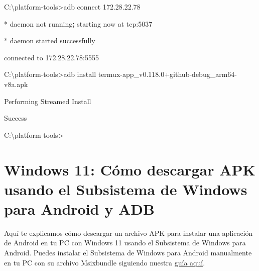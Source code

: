 \documentclass[
  doc,
  floatsintext,
  longtable,
  a4paper,
  nolmodern,
  notxfonts,
  notimes,
  12pt,
  colorlinks=true,linkcolor=blue,citecolor=blue,urlcolor=blue]{apa7}
\newenvironment{Shaded}{\begin{snugshade}}{\end{snugshade}}
\newcommand{\ExtensionTok}[1]{\textcolor[rgb]{0.00,0.23,0.31}{#1}}
\newcommand{\KeywordTok}[1]{\textcolor[rgb]{0.00,0.23,0.31}{\textbf{#1}}}
\newcommand{\NormalTok}[1]{\textcolor[rgb]{0.00,0.23,0.31}{#1}}
\newcommand{\OperatorTok}[1]{\textcolor[rgb]{0.37,0.37,0.37}{#1}}
\begin{document}
\begin{Shaded}
\begin{Highlighting}[]

\ExtensionTok{C:\textbackslash{}platform{-}tools}\OperatorTok{\textgreater{}}\NormalTok{adb connect 172.28.22.78}

\ExtensionTok{*}\NormalTok{ daemon not running}\KeywordTok{;} \ExtensionTok{starting}\NormalTok{ now at tcp:5037}

\ExtensionTok{*}\NormalTok{ daemon started successfully}

\ExtensionTok{connected}\NormalTok{ to 172.28.22.78:5555}
\end{Highlighting}
\end{Shaded}

\begin{Shaded}
\begin{Highlighting}[]

\ExtensionTok{C:\textbackslash{}platform{-}tools}\OperatorTok{\textgreater{}}\NormalTok{adb install termux{-}app\_v0.118.0+github{-}debug\_arm64{-}v8a.apk}

\ExtensionTok{Performing}\NormalTok{ Streamed Install}

\ExtensionTok{Success}
\end{Highlighting}
\end{Shaded}

\begin{Shaded}
\begin{Highlighting}[]

\ExtensionTok{C:\textbackslash{}platform{-}tools}\OperatorTok{\textgreater{}}
\end{Highlighting}
\end{Shaded}

\section{Windows 11: Cómo descargar APK usando el Subsistema de Windows
para Android y
ADB}\label{windows-11-cuxf3mo-descargar-apk-usando-el-subsistema-de-windows-para-android-y-adb}

Aquí te explicamos cómo descargar un archivo APK para instalar una
aplicación de Android en tu PC con Windows 11 usando el Subsistema de
Windows para Android. Puedes instalar el Subsistema de Windows para
Android manualmente en tu PC con su archivo Msixbundle siguiendo nuestra
\href{https://nerdschalk.com/android-apps-on-windows-11-dev-channel-how-to-install-windows-subsystem-for-android-manually-with-msixbundle/}{guía
aquí}.
\end{document}
